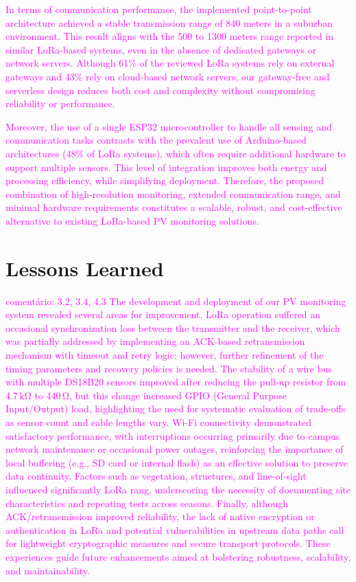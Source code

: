 \documentclass{ieeeaccess}
\begin{document}
\textcolor{magenta}{
In terms of communication performance, the implemented point-to-point architecture achieved a stable transmission range of 840 meters in a suburban environment. This result aligns with the 500 to 1300 meters range reported in similar LoRa-based systems, even in the absence of dedicated gateways or network servers. Although 61\% of the reviewed LoRa systems rely on external gateways and 43\% rely on cloud-based network servers, our gateway-free and serverless design reduces both cost and complexity without compromising reliability or performance.}

\textcolor{magenta}{
Moreover, the use of a single ESP32 microcontroller to handle all sensing and communication tasks contrasts with the prevalent use of Arduino-based architectures (48\% of LoRa systems), which often require additional hardware to support multiple sensors. This level of integration improves both energy and processing efficiency, while simplifying deployment. Therefore, the proposed combination of high-resolution monitoring, extended communication range, and minimal hardware requirements constitutes a scalable, robust, and cost-effective alternative to existing LoRa-based PV monitoring solutions.}


\section{Lessons Learned}
\textcolor{magenta}{comentário: 3.2, 3.4, 4.3}
\textcolor{magenta}{
The development and deployment of our PV monitoring system revealed several areas for improvement. LoRa operation suffered an occasional synchronization loss between the transmitter and the receiver, which was partially addressed by implementing an ACK-based retransmission mechanism with timeout and retry logic; however, further refinement of the timing parameters and recovery policies is needed. The stability of a wire bus with multiple DS18B20 sensors improved after reducing the pull-up resistor from 4.7 kΩ to 440 Ω, but this change increased GPIO (General Purpose Input/Output) load, highlighting the need for systematic evaluation of trade-offs as sensor count and cable lengths vary. Wi-Fi connectivity demonstrated satisfactory performance, with interruptions occurring primarily due to campus network maintenance or occasional power outages, reinforcing the importance of local buffering (e.g., SD card or internal flash) as an effective solution to preserve data continuity.
}
\textcolor{magenta}{
Factors such as vegetation, structures, and line-of-sight influenced significantly LoRa rang, underscoring the necessity of documenting site characteristics and repeating tests across seasons. Finally, although ACK/retransmission improved reliability, the lack of native encryption or authentication in LoRa and potential vulnerabilities in upstream data paths call for lightweight cryptographic measures and secure transport protocols. These experiences guide future enhancements aimed at bolstering robustness, scalability, and maintainability.
}
\end{document}

